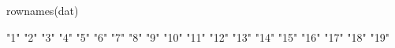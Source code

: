 \begin{Schunk}
\begin{Sinput}
  rownames(dat)
\end{Sinput}
\begin{Soutput}
 [1] "1"  "2"  "3"  "4"  "5"  "6"  "7"  "8"  "9"  "10" "11" "12" "13" "14" "15" "16" "17" "18" "19"
\end{Soutput}
\end{Schunk}
